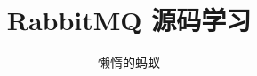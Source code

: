 \documentclass[a4paper,12pt]{book}
\begin{document}
\author{懒惰的蚂蚁}
\title{RabbitMQ 源码学习}

\frontmatter
\maketitle
\tableofcontents

\mainmatter








\backmatter
\end{document}
